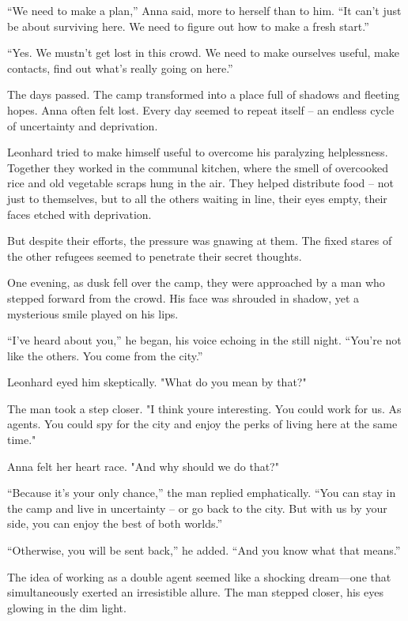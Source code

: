 \documentclass[
]{article}
\begin{document}
``We need to make a plan,'' Anna said, more to herself than to him. ``It can't just be about surviving here. We need to figure out how to make a fresh start.''

``Yes. We mustn't get lost in this crowd. We need to make ourselves useful, make contacts, find out what's really going on here.''

The days passed. The camp transformed into a place full of shadows and fleeting hopes. Anna often felt lost. Every day seemed to repeat itself -- an endless cycle of uncertainty and deprivation.

Leonhard tried to make himself useful to overcome his paralyzing helplessness. Together they worked in the communal kitchen, where the smell of overcooked rice and old vegetable scraps hung in the air. They helped distribute food -- not just to themselves, but to all the others waiting in line, their eyes empty, their faces etched with deprivation.

But despite their efforts, the pressure was gnawing at them. The fixed stares of the other refugees seemed to penetrate their secret thoughts.

One evening, as dusk fell over the camp, they were approached by a man who stepped forward from the crowd. His face was shrouded in shadow, yet a mysterious smile played on his lips.

``I've heard about you,'' he began, his voice echoing in the still night. ``You're not like the others. You come from the city.''

Leonhard eyed him skeptically. "What do you mean by that?"

The man took a step closer. "I think you\textquotesingle re interesting. You could work for us. As agents. You could spy for the city and enjoy the perks of living here at the same time."

Anna felt her heart race. "And why should we do that?"

``Because it's your only chance,'' the man replied emphatically. ``You can stay in the camp and live in uncertainty -- or go back to the city. But with us by your side, you can enjoy the best of both worlds.''

``Otherwise, you will be sent back,'' he added. ``And you know what that means.''

The idea of \hspace{0pt}\hspace{0pt}working as a double agent seemed like a shocking dream---one that simultaneously exerted an irresistible allure. The man stepped closer, his eyes glowing in the dim light.
\end{document}
